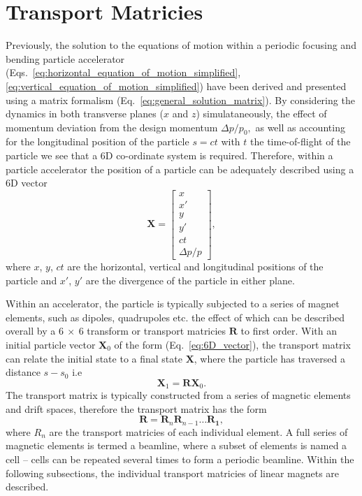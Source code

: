 \documentclass[../main.tex]{subfiles}
\begin{document}
\section{Transport Matricies} 

Previously, the solution to the equations of motion within a periodic focusing and bending particle accelerator (Eqs.~\ref{eq:horizontal_equation_of_motion_simplified}, \ref{eq:vertical_equation_of_motion_simplified}) have been derived and presented using a matrix formalism (Eq.~\ref{eq:general_solution_matrix}). By considering the dynamics in both transverse planes ($x$ and $z$) simulataneously, the effect of momentum deviation from the design momentum $\Delta p/p_{0},$ as well as accounting for the longitudinal position of the particle $s=ct$ with $t$ the time-of-flight of the particle we see that a 6D co-ordinate system is required. Therefore, within a particle accelerator the position of a particle can be adequately described using a 6D vector 
\begin{equation}
\boldsymbol{X} = 
\begin{bmatrix}
x \\
x' \\
y \\
y' \\
ct \\
\Delta p/p
\end{bmatrix},
\label{eq:6D_vector}
\end{equation}
where $x$, $y$, $ct$ are the horizontal, vertical and longitudinal positions of the particle and $x'$, $y'$ are the divergence of the particle in either plane.

Within an accelerator, the particle is typically subjected to a series of magnet elements, such as dipoles, quadrupoles etc. the effect of which can be described overall by a $6~\times~6$ transform or transport matricies $\boldsymbol{R}$ to first order. With an initial particle vector $\boldsymbol{X}_{0}$ of the form (Eq.~\ref{eq:6D_vector}), the transport matrix can relate the initial state to a final state $\boldsymbol{X}$, where the particle has traversed a distance $s-s_{0}$ i.e
\begin{equation}
\boldsymbol{X}_{1} = \boldsymbol{R}\boldsymbol{X}_{0}.
\label{eq:overall_transport_matrix}
\end{equation}
The transport matrix is typically constructed from a series of magnetic elements and drift spaces, therefore the transport matrix has the form
\begin{equation}
\boldsymbol{R} = \boldsymbol{R}_{n}\boldsymbol{R}_{n-1}\ldots\boldsymbol{R_{1}},
\label{eq:subseries_transport_matrix}    
\end{equation}
where $R_{n}$ are the transport matricies of each individual element. A full series of magnetic elements is termed a beamline, where a subset of elements is named a cell -- cells can be repeated several times to form a periodic beamline. Within the following subsections, the individual transport matricies of linear magnets are described. 
\end{document}
